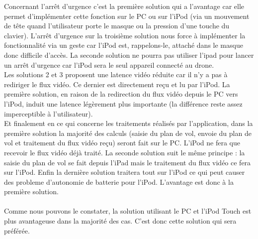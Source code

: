 \documentclass{article}
\begin{document}
        \indent Concernant l'arrêt d'urgence c'est la première solution qui a l'avantage car elle permet d'implémenter cette fonction sur le PC ou sur l'iPod (via un mouvement de tête quand l'utilisateur porte le masque ou la pression d'une touche du clavier). L'arrêt d'urgence sur la troisième solution nous force à implémenter la fonctionnalité via un geste car l'iPod est, rappelons-le, attaché dans le masque donc difficile d'accès. La seconde solution ne pourra pas utiliser l'ipad pour lancer un arrêt d'urgence car l'iPod sera le seul appareil connecté au drone.\\
        
        \indent Les solutions 2 et 3 proposent une latence vidéo réduite car il n'y a pas à rediriger le flux vidéo. Ce dernier est directement reçu et lu par l'iPod. La première solution, en raison de la redirection du flux vidéo depuis le PC vers l'iPod, induit une latence légèrement plus importante (la différence reste assez imperceptible à l'utilisateur).\\
        
        \indent Et finalement en ce qui concerne les traitements réalisés par l'application, dans la première solution la majorité des calculs (saisie du plan de vol, envoie du plan de vol et traitement du flux vidéo reçu) seront fait sur le PC. L'iPod ne fera que recevoir le flux vidéo déjà traité. La seconde solution suit le même principe : la saisie du plan de vol se fait depuis l'iPad mais le traitement du flux vidéo ce fera sur l'iPod. Enfin la dernière solution traitera tout sur l'iPod ce qui peut causer des probleme d'autonomie de batterie pour l'iPod. L'avantage est donc à la première solution.\\ \\
        
        \indent Comme nous pouvons le constater, la solution utilisant le PC et l'iPod Touch est plus avantageuse dans la majorité des cas. C'est donc cette solution qui sera préférée.\\
        
\end{document}
